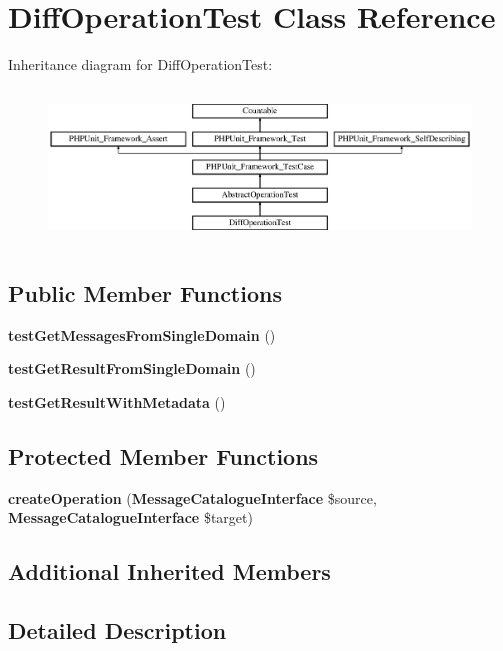 \section{Diff\+Operation\+Test Class Reference}
\label{class_symfony_1_1_component_1_1_translation_1_1_tests_1_1_catalogue_1_1_diff_operation_test}
Inheritance diagram for Diff\+Operation\+Test\+:\begin{figure}[H]
\begin{center}
\leavevmode
\includegraphics[height=4.129793cm]{class_symfony_1_1_component_1_1_translation_1_1_tests_1_1_catalogue_1_1_diff_operation_test}
\end{center}
\end{figure}
\subsection*{Public Member Functions}
\begin{DoxyCompactItemize}
\item 
{\bf test\+Get\+Messages\+From\+Single\+Domain} ()
\item 
{\bf test\+Get\+Result\+From\+Single\+Domain} ()
\item 
{\bf test\+Get\+Result\+With\+Metadata} ()
\end{DoxyCompactItemize}
\subsection*{Protected Member Functions}
\begin{DoxyCompactItemize}
\item 
{\bf create\+Operation} ({\bf Message\+Catalogue\+Interface} \$source, {\bf Message\+Catalogue\+Interface} \$target)
\end{DoxyCompactItemize}
\subsection*{Additional Inherited Members}


\subsection{Detailed Description}


